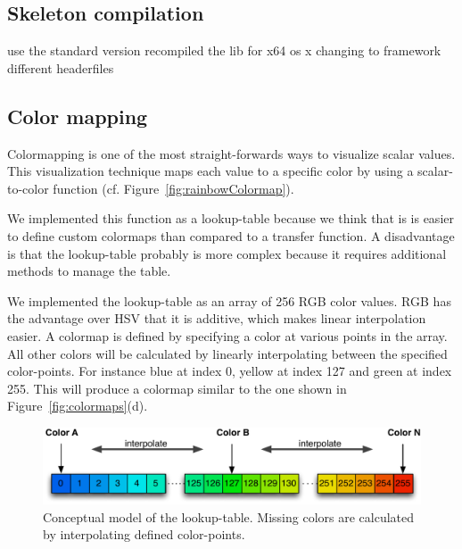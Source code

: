 \subsection{Skeleton compilation}

use the standard version
recompiled the lib for x64 os x 
changing to framework 
different headerfiles

\subsection{Color mapping}
Colormapping is one of the most straight-forwards ways to visualize scalar values. This visualization technique maps each value to a specific color by using a scalar-to-color function (cf. Figure~\ref{fig:rainbowColormap}). 

We implemented this function as a lookup-table because we think that is is easier to define custom colormaps than compared to a transfer function. A disadvantage is that the lookup-table probably is more complex because it requires additional methods to manage the table.

We implemented the lookup-table as an array of 256 RGB color values. RGB has the advantage over HSV that it is additive, which makes linear interpolation easier. A colormap is defined by specifying a color at various points in the array. All other colors will be calculated by linearly interpolating between the specified color-points. For instance blue at index 0, yellow at index 127 and green at index 255. This will produce a colormap similar to the one shown in Figure~\ref{fig:colormaps}(d). 

\begin{figure}[htbp]
    \centering
    \includegraphics[width=.8\textwidth]{figures/colormaps/lookuptable.pdf}
    \caption{Conceptual model of the lookup-table. Missing colors are calculated by interpolating defined color-points.}
    \label{fig:lookupTable}
\end{figure}

